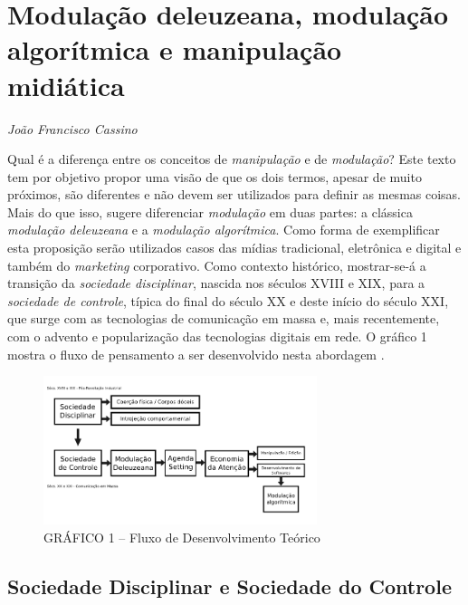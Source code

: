 \chapter{Modulação deleuzeana, modulação algorítmica e manipulação midiática}

\begin{flushright}
\emph{João Francisco Cassino}
\end{flushright}

Qual é a diferença entre os conceitos de \emph{manipulação} e de
\emph{modulação}? Este texto tem por objetivo propor uma visão de que os
dois termos, apesar de muito próximos, são diferentes e não devem ser
utilizados para definir as mesmas coisas. Mais do que isso, sugere
diferenciar \emph{modulação} em duas partes: a clássica \emph{modulação
deleuzeana} e a \emph{modulação algorítmica}. Como forma de exemplificar
esta proposição serão utilizados casos das mídias tradicional,
eletrônica e digital e também do \emph{marketing} corporativo. Como
contexto histórico, mostrar-se-á a transição da \emph{sociedade
disciplinar}, nascida nos séculos XVIII e XIX, para a \emph{sociedade de
controle}, típica do final do século XX e deste início do século XXI,
que surge com as tecnologias de comunicação em massa e, mais
recentemente, com o advento e popularização das tecnologias digitais em
rede. O gráfico 1 mostra o fluxo de pensamento a ser desenvolvido nesta
abordagem .

\begin{figure}[!ht]
\centering
  \includegraphics[width=80mm]{./imgs/grafico1.png}
\caption{GRÁFICO 1 -- Fluxo de Desenvolvimento Teórico}
 \end{figure}

\section{Sociedade Disciplinar e Sociedade do Controle}

